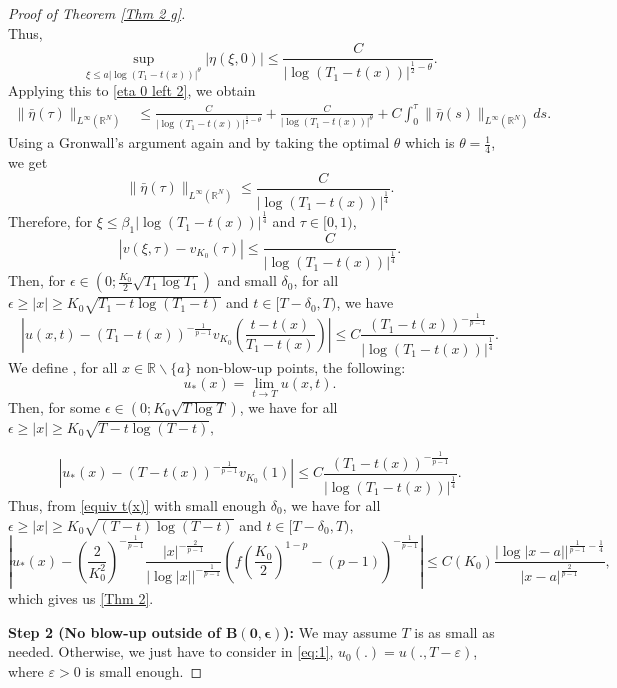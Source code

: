 \documentclass[11pt,a4paper]{article}
\newcommand{\1}{\mathbbm{1}}
\numberwithin{equation}{section}
\newcommand{\numberset}{\mathbb}
\newcommand{\R}{\numberset{R}}
\theoremstyle{remark}
\begin{document}
\begin{proof}[Proof of Theorem \ref{Thm 2 g}]
\begin{equation*}
\end{equation*}
Thus,
\begin{equation}\label{profile v(0)}
\underset{\xi\leq a |\log(T_1-t(x))|^{\theta}}{\sup}|\eta(\xi,0)|\leq \frac{C}{|\log(T_1-t(x))|^{\frac{1}{2}-\theta}}.
\end{equation}
Applying this to \eqref{eta 0 left 2}, we obtain
\begin{equation*}
\begin{split}
\|\bar{\eta}(\tau)\|_{L^\infty(\R^N)}&\leq \frac{C}{|\log(T_1-t(x))|^{\frac{1}{2}-\theta}}+\frac{C}{|\log (T_1-t(x))|^{\theta}}+C\int^\tau_0 \|\bar{\eta}(s)\|_{L^\infty(\R^N)}ds.
\end{split}
\end{equation*}
Using a Gronwall's argument again and by taking the optimal $\theta$ which is $\theta=\frac{1}{4}$, we get 
$$\|\bar{\eta}(\tau)\|_{L^\infty(\R^N)} \leq \frac{C}{|\log(T_1-t(x))|^{\frac{1}{4}}}.$$
Therefore, for $\xi\leq \beta_1|\log(T_1-t(x))|^{\frac{1}{4}}$ and $\tau \in [0,1)$,
$$|v(\xi,\tau)-v_{K_0}(\tau)|\leq \frac{C}{|\log(T_1-t(x))|^{\frac{1}{4}}}.$$
Then, for $\epsilon\in  (0; \frac{K_0}{2} \sqrt{T_1 \log T_1})$ and small $\delta_0$, for all $\epsilon\geq |x|\geq K_0 \sqrt{T_1-t \log (T_1-t)}$ and $t\in [T-\delta_0,T)$, we have
$$\left|u(x,t)-(T_1-t(x))^{-\frac{1}{p-1}}v_{K_0}\left(\frac{t-t(x)}{T_1-t(x)}\right)\right|\leq  C\frac{(T_1-t(x))^{-\frac{1}{p-1}}}{|\log(T_1-t(x))|^{\frac{1}{4}}}.$$
We define , for all $x\in \R\backslash \{a\}$ non-blow-up points, the following:
$$u_*(x)=\underset{t\rightarrow T}{\lim}u(x,t).$$
Then, for some  $\epsilon\in  (0; K_0 \sqrt{T \log T})$, we have for all $\epsilon\geq |x|\geq K_0 \sqrt{T-t \log (T-t)},$

$$|u_*(x)-(T-t(x))^{-\frac{1}{p-1}}v_{K_0}(1)|\leq  C\frac{(T_1-t(x))^{-\frac{1}{p-1}}}{|\log(T_1-t(x))|^{\frac{1}{4}}}.$$
Thus, from \eqref{equiv t(x)} with small enough $\delta_0$, we have for all $\epsilon\geq |x|\geq K_0 \sqrt{(T-t )\log (T-t)}$ and $t\in [T-\delta_0,T),$
\begin{equation}\label{final profile proof}
\left|u_*(x)-\left(\frac{2}{K_0^2}\right)^{-\frac{1}{p-1}}\frac{|x|^{-\frac{2}{p-1}}}{|\log|x||^{-\frac{1}{p-1}}}\left(f\left(\frac{K_0}{2}\right)^{1-p}-(p-1)\right)^{-\frac{1}{p-1}}\right|\leq  C(K_0) \frac {|\log|x-a||^{\frac{1}{p-1} - \frac{1}{4}}} {|x-a|^{\frac{2}{p-1}}},
\end{equation}
which gives us \eqref{Thm 2}. 

\textbf{Step 2 (No blow-up outside of $\mathbf{B(0,\epsilon)}$):} We may assume $T$ is as small as needed. Otherwise, we just have to consider in \eqref{eq:1}, $u_0(.)=u(.,T-\varepsilon)$, where $\varepsilon>0$ is small enough.


\end{proof}
\end{document}
